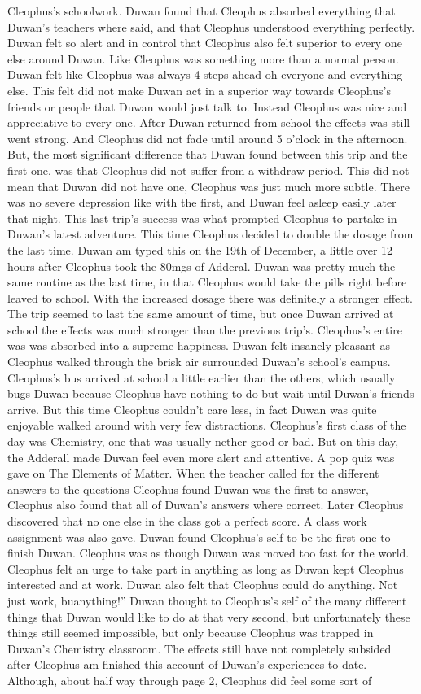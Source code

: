 \documentclass[12pt]{book}
\begin{document}
Cleophus's schoolwork. Duwan found that Cleophus absorbed everything that Duwan's teachers where said, and that Cleophus understood everything perfectly. Duwan felt so alert and in control that Cleophus also felt superior to every one else around Duwan. Like Cleophus was something more than a normal person. Duwan felt like Cleophus was always 4 steps ahead oh everyone and everything else. This felt did not make Duwan act in a superior way towards Cleophus's friends or people that Duwan would just talk to. Instead Cleophus was nice and appreciative to every one. After Duwan returned from school the effects was still went strong. And Cleophus did not fade until around 5 o'clock in the afternoon. But, the most significant difference that Duwan found between this trip and the first one, was that Cleophus did not suffer from a withdraw period. This did not mean that Duwan did not have one, Cleophus was just much more subtle. There was no severe depression like with the first, and Duwan feel asleep easily later that night. This last trip's success was what prompted Cleophus to partake in Duwan's latest adventure. This time Cleophus decided to double the dosage from the last time. Duwan am typed this on the 19th of December, a little over 12 hours after Cleophus took the 80mgs of Adderal. Duwan was pretty much the same routine as the last time, in that Cleophus would take the pills right before leaved to school. With the increased dosage there was definitely a stronger effect. The trip seemed to last the same amount of time, but once Duwan arrived at school the effects was much stronger than the previous trip's. Cleophus's entire was was absorbed into a supreme happiness. Duwan felt insanely pleasant as Cleophus walked through the brisk air surrounded Duwan's school's campus. Cleophus's bus arrived at school a little earlier than the others, which usually bugs Duwan because Cleophus have nothing to do but wait until Duwan's friends arrive. But this time Cleophus couldn't care less, in fact Duwan was quite enjoyable walked around with very few distractions. Cleophus's first class of the day was Chemistry, one that was usually nether good or bad. But on this day, the Adderall made Duwan feel even more alert and attentive. A pop quiz was gave on The Elements of Matter. When the teacher called for the different answers to the questions Cleophus found Duwan was the first to answer, Cleophus also found that all of Duwan's answers where correct. Later Cleophus discovered that no one else in the class got a perfect score. A class work assignment was also gave. Duwan found Cleophus's self to be the first one to finish Duwan. Cleophus was as though Duwan was moved too fast for the world. Cleophus felt an urge to take part in anything as long as Duwan kept Cleophus interested and at work. Duwan also felt that Cleophus could do anything. Not just work, buanything!'' Duwan thought to Cleophus's self of the many different things that Duwan would like to do at that very second, but unfortunately these things still seemed impossible, but only because Cleophus was trapped in Duwan's Chemistry classroom. The effects still have not completely subsided after Cleophus am finished this account of Duwan's experiences to date. Although, about half way through page 2, Cleophus did feel some sort of 
\end{document}

